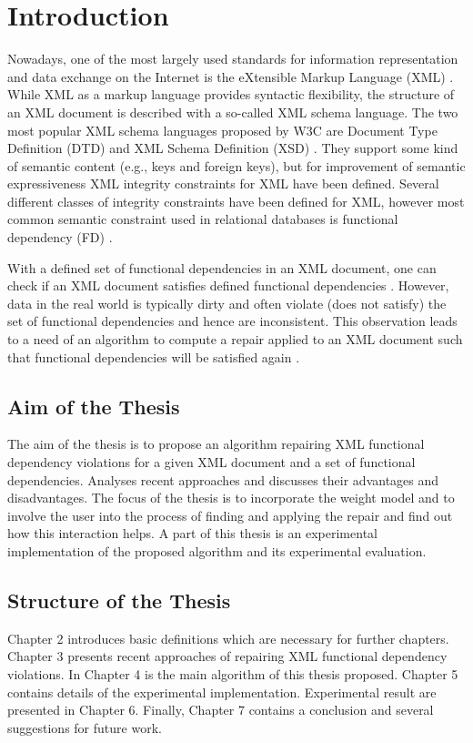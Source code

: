 \chapter{Introduction}

Nowadays, one of the most largely used standards for information representation and data exchange on the Internet is the eXtensible Markup Language (XML) \cite{xml}. While XML as a markup language provides syntactic flexibility, the structure of an XML document is described with a so-called XML schema language. The two most popular XML schema languages proposed by W3C are Document Type Definition (DTD) \cite{xml} and XML Schema Definition (XSD) \cite{xsd1,xsd2,xsd3}. They support some kind of semantic content (e.g., keys and foreign keys), but for improvement of semantic expressiveness XML integrity constraints for XML \cite{ic} have been defined. Several different classes of integrity constraints have been defined for XML, however most common semantic constraint used in relational databases is functional dependency (FD) \cite{fd}.

With a defined set of functional dependencies in an XML document, one can check if an XML document satisfies defined functional dependencies \cite{satifFD}. However, data in the real world is typically dirty and often violate (does not satisfy) the set of functional dependencies and hence are inconsistent. This observation leads to a need of an algorithm to compute a repair applied to an XML document such that functional dependencies will be satisfied  again \cite{RepAndConsistentAnswer, QueryXML, ImprovingXML}.

\section{Aim of the Thesis}

The aim of the thesis is to propose an algorithm repairing XML functional dependency violations for a given XML document and a set of functional dependencies. Analyses recent approaches and discusses their advantages and disadvantages. The focus of the thesis is to incorporate the weight model and to involve the user into the process of finding and applying the repair and find out how this interaction helps. A part of this thesis is an experimental implementation of the proposed algorithm and its experimental evaluation.

\section{Structure of the Thesis}

Chapter 2 introduces basic definitions which are necessary for further chapters. Chapter 3 presents recent approaches of repairing XML functional dependency violations. In Chapter 4 is the main algorithm of this thesis proposed. Chapter 5 contains details of the experimental implementation. Experimental result are presented in Chapter 6. Finally, Chapter 7 contains a conclusion and several suggestions for future work.
